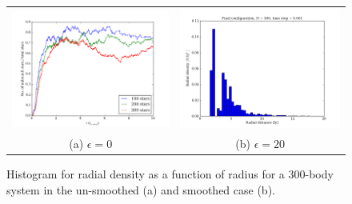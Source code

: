 \documentclass{article}
\begin{document}
\begin{multicols}{2}
\begin{figure}
\begin{center}
\begin{tabular}{cc}
  	\includegraphics[width=90mm]{Images/unbound_stars.png}
	& \includegraphics[width=90mm]{Images/histogram_300_epsilon20.png} \\
	(a) $\epsilon = 0$		& (b) $\epsilon = 20$  \\[6pt]
\end{tabular}
\caption{Histogram for radial density as a function of radius for a 300-body system in the un-smoothed (a) and smoothed case (b).}\label{fig:Nbody_histogram}
\end{center}
\end{figure}


%
%







\end{multicols}
\end{document}
